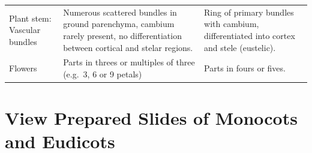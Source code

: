 \documentclass[]{book}
\begin{document}
\begin{longtable}[]{@{}lll@{}}
\begin{minipage}[t]{0.24\columnwidth}\raggedright
Plant stem: Vascular bundles\strut
\end{minipage} & \begin{minipage}[t]{0.37\columnwidth}\raggedright
Numerous scattered bundles in ground parenchyma, cambium rarely present, no differentiation between cortical and stelar regions.\strut
\end{minipage} & \begin{minipage}[t]{0.30\columnwidth}\raggedright
Ring of primary bundles with cambium, differentiated into cortex and stele (eustelic).\strut
\end{minipage}\tabularnewline
\begin{minipage}[t]{0.24\columnwidth}\raggedright
Flowers\strut
\end{minipage} & \begin{minipage}[t]{0.37\columnwidth}\raggedright
Parts in threes or multiples of three (e.g.~3, 6 or 9 petals)\strut
\end{minipage} & \begin{minipage}[t]{0.30\columnwidth}\raggedright
Parts in fours or fives.\strut
\end{minipage}\tabularnewline
\bottomrule
\end{longtable}

\hypertarget{view-prepared-slides-of-monocots-and-eudicots}{%
\section{View Prepared Slides of Monocots and Eudicots}\label{view-prepared-slides-of-monocots-and-eudicots}}
\end{document}
